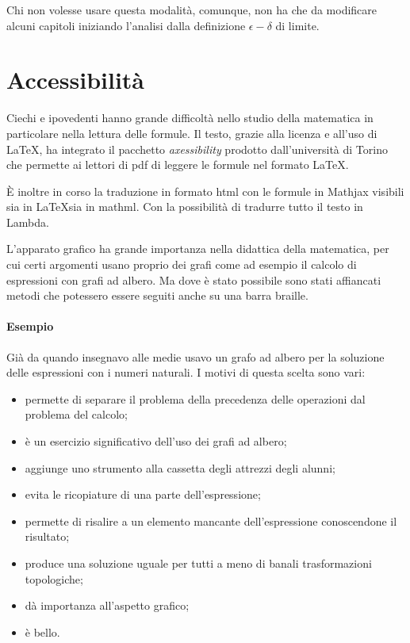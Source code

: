 \documentclass[a4paper,10pt]{article}
\begin{document}
\vspace{1em}
Chi non volesse usare questa modalità, comunque, non ha che da modificare 
alcuni capitoli iniziando l'analisi dalla definizione \(\epsilon - \delta\) 
di limite.

\section{Accessibilità}

Ciechi e ipovedenti hanno grande difficoltà nello studio della matematica 
in particolare nella lettura delle formule.
Il testo, grazie alla licenza e all'uso di \LaTeX, ha integrato il pacchetto 
\emph{axessibility} prodotto dall'università di Torino che permette ai 
lettori di pdf di leggere le formule nel formato \LaTeX.

È inoltre in corso la traduzione in formato html con le formule in Mathjax 
visibili sia in \LaTeX sia in mathml. Con la possibilità di tradurre tutto il 
testo in Lambda.

L'apparato grafico ha grande importanza nella didattica della matematica, per 
cui certi argomenti usano proprio dei grafi come ad esempio il calcolo di 
espressioni con grafi ad albero.
Ma dove è stato possibile sono stati affiancati metodi che potessero essere 
seguiti anche su una barra braille.

\paragraph{Esempio} Già da quando insegnavo alle medie usavo un grafo ad 
albero per la soluzione delle espressioni con i numeri naturali. 
I motivi di questa scelta sono vari:

\begin{itemize} [noitemsep]
\item permette di separare il problema della precedenza delle operazioni dal 
problema del calcolo;
\item è un esercizio significativo dell'uso dei grafi ad albero;
\item aggiunge uno strumento alla cassetta degli attrezzi degli alunni;
\item evita le ricopiature di una parte dell'espressione;
\item permette di risalire a un elemento mancante dell'espressione 
conoscendone il risultato;
\item produce una soluzione uguale per tutti a meno di banali 
trasformazioni topologiche;
\item dà importanza all'aspetto grafico;
\item è bello.
\end{itemize}
\end{document}
